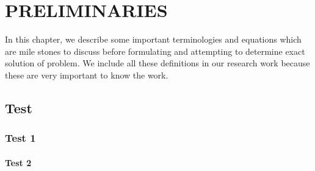 \chapter{PRELIMINARIES}

 In this chapter, we describe some important terminologies and equations which are mile stones to discuss before formulating and attempting  to determine exact solution of problem. We include all these definitions in our research work because these are very important to know the work.
 
 \section{Test}
 \subsection{Test 1}
 \subsubsection{Test 2}
